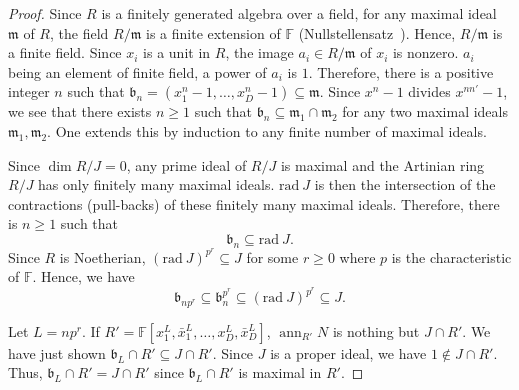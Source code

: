 \documentclass[letterpaper,12pt]{amsart}
\theoremstyle{definition} \newtheorem{defn}{Definition}
\theoremstyle{definition} \newtheorem{rem}{Remark}
\theoremstyle{definition} \newtheorem{example}{Example}
\newcommand{\ann}{\mathop{\mathrm{ann}}}
\newcommand{\FF}{\mathbb{F}}
\newcommand{\mm}{\mathfrak{m}}
\newcommand{\bb}{\mathfrak{b}}
\begin{document}
\begin{proof}
Since $R$ is a finitely generated algebra over a field,
for any maximal ideal $\mm$ of $R$, the field $R/\mm$ is a finite extension of $\FF$
(Nullstellensatz~\cite[Theorem~4.19]{Eisenbud}).
Hence, $R/\mm$ is a finite field.
Since $x_i$ is a unit in $R$, the image $a_i \in R/\mm$ of $x_i$ is nonzero.
$a_i$ being an element of finite field, a power of $a_i$ is $1$.
Therefore, there is a positive integer $n$ such that
$\bb_n = (x_1^n-1,\ldots,x_D^n-1) \subseteq \mm$.
Since $x^n-1$ divides $x^{nn'}-1$,
we see that there exists $n \ge 1$ such that $\bb_n \subseteq \mm_1 \cap \mm_2$
for any two maximal ideals $\mm_1, \mm_2$.
One extends this by induction to any finite number of maximal ideals.

Since $\dim R/J = 0$, any prime ideal of $R/J$ is maximal and 
the Artinian ring $R/J$ has only finitely many maximal ideals.
$\mathrm{rad}~ J$ is then the intersection of the contractions (pull-backs)
of these finitely many maximal ideals.
Therefore, there is $n \ge 1$ such that
\[
 \bb_n \subseteq \mathrm{rad}~ J .
\]
Since $R$ is Noetherian, $(\mathrm{rad}~J)^{p^r} \subseteq J$ for some $r \ge 0$
where $p$ is the characteristic of $\FF$. Hence, we have 
\[
\bb_{np^r} \subseteq \bb_n^{p^r} \subseteq (\mathrm{rad}~J)^{p^r} \subseteq J.
\]

Let $L = np^r$.
If $R' = \FF[x_1^L,\bar x_1^L,\ldots,x_D^L,\bar x_D^L]$,
$\ann_{R'} N$ is nothing but $J \cap R'$.
We have just shown $\bb_L \cap R' \subseteq J \cap R'$.
Since $J$ is a proper ideal, we have $1 \notin J \cap R'$.
Thus, $\bb_L \cap R'= J \cap R'$ since $\bb_L \cap R'$ is maximal in $R'$.
\end{proof}
\end{document}
